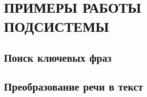\chapter{ПРИМЕРЫ РАБОТЫ ПОДСИСТЕМЫ}
\section{Поиск ключевых фраз}
\section{Преобразование речи в текст}
